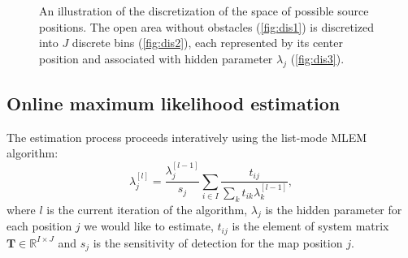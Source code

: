 \begin{figure}[!h]
  \centering

  \caption{An illustration of the discretization of the space of possible source positions. The open area without obstacles (\ref{fig:dis1}) is discretized into $J$ discrete bins (\ref{fig:dis2}), each represented by its center position and associated with hidden parameter $\lambda_{j}$ (\ref{fig:dis3}).}
  \label{fig:discretization}
\end{figure}%

\subsection{Online maximum likelihood estimation}%
The estimation process proceeds interatively using the list-mode \ac{MLEM} algorithm:
\begin{equation}
  \lambda_{j}^{[l]} = \frac{\lambda_{j}^{[l-1]}}{s_{j}} \sum_{i \in I} \frac{t_{ij}}{\sum_{k} t_{ik} \lambda_{k}^{[l-1]}},
  \label{eq:MLEM}
\end{equation}
where $l$ is the current iteration of the algorithm, $\lambda_{j}$ is the hidden parameter for each position $j$ we would like to estimate, $t_{ij}$ is the element of system matrix $\mathbf{T}\in \mathbb{R}^{I \times J}$ and $s_{j}$ is the sensitivity of detection for the map position $j$.

